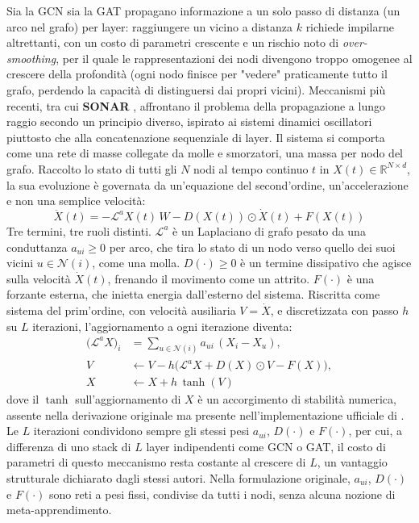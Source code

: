 Sia la GCN sia la GAT propagano informazione a un solo passo di distanza
(un arco nel grafo) per layer: raggiungere un vicino a distanza $k$
richiede impilarne altrettanti, con un costo di parametri crescente e un
rischio noto di \emph{over-smoothing}, per il quale le rappresentazioni
dei nodi divengono troppo omogenee al crescere della profondità (ogni nodo
finisce per "vedere" praticamente tutto il grafo, perdendo la capacità di
distinguersi dai propri vicini). Meccanismi più recenti, tra cui \textbf{SONAR} \citep{trenta2025sonar},
affrontano il problema della propagazione a lungo raggio secondo un
principio diverso, ispirato ai sistemi dinamici oscillatori piuttosto che
alla concatenazione sequenziale di layer. Il sistema si comporta come una
rete di masse collegate da molle e smorzatori, una massa per nodo del
grafo. Raccolto lo stato di tutti gli $N$ nodi al tempo continuo $t$ in
$X(t) \in \mathbb{R}^{N \times d}$, la sua evoluzione è governata da
un'equazione del second'ordine, un'accelerazione e non una semplice
velocità:
\begin{equation}
  \ddot X(t) = -\mathcal{L}^a X(t)\, W - D(X(t)) \odot \dot X(t) + F(X(t))
  \label{eq:sonar-wave-background}
\end{equation}
Tre termini, tre ruoli distinti. $\mathcal{L}^a$ è un Laplaciano di grafo
pesato da una conduttanza $a_{ui} \geq 0$ per arco, che tira lo stato di un
nodo verso quello dei suoi vicini $u \in \mathcal{N}(i)$, come una molla.
$D(\cdot) \geq 0$ è un termine dissipativo che agisce sulla velocità
$\dot X(t)$, frenando il movimento come un attrito. $F(\cdot)$ è una
forzante esterna, che inietta energia dall'esterno del sistema. Riscritta
come sistema del prim'ordine, con velocità ausiliaria $V=\dot X$, e
discretizzata con passo $h$ su $L$ iterazioni, l'aggiornamento a ogni
iterazione diventa:
\begin{equation}
  \begin{aligned}
    \big(\mathcal{L}^a X\big)_i & = \sum_{u \in \mathcal{N}(i)} a_{ui}\,(X_i - X_u),              \\
    V                           & \leftarrow V - h\big(\mathcal{L}^a X + D(X)\odot V - F(X)\big), \\
    X                           & \leftarrow X + h\,\tanh(V)
  \end{aligned}
  \label{eq:sonar-discrete-background}
\end{equation}
dove il $\tanh$ sull'aggiornamento di $X$ è un accorgimento di stabilità
numerica, assente nella derivazione originale ma presente
nell'implementazione ufficiale di \citet{trenta2025sonar}. Le $L$
iterazioni condividono sempre gli stessi pesi $a_{ui}$, $D(\cdot)$ e
$F(\cdot)$, per cui, a differenza di uno stack di $L$ layer indipendenti
come GCN o GAT, il costo di parametri di questo meccanismo resta costante
al crescere di $L$, un vantaggio strutturale dichiarato dagli stessi
autori. Nella formulazione originale, $a_{ui}$, $D(\cdot)$ e $F(\cdot)$
sono reti a pesi fissi, condivise da tutti i nodi, senza alcuna nozione di
meta-apprendimento.

